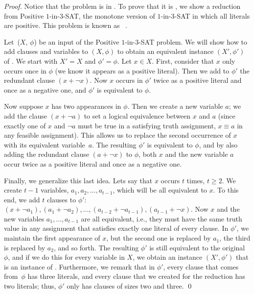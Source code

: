 \begin{proof}
    Notice that the problem is in \classNP{}. To prove that it is \classNPH{}, we show a reduction from Positive $1$-in-$3$-SAT, the monotone version of $1$-in-$3$-SAT in which all literals are positive. This problem is known as \classNPC{}~\cite{Ga79}.

    Let~($X$, $\phi$) be an input of the Positive $1$-in-$3$-SAT problem.
    We will show how to add clauses and variables to $(X, \phi)$ to obtain an equivalent instance $(X', \phi')$ of \rXthreeSAT{}. We start with $X' = X$ and $\phi' = \phi$.
    Let $x \in X$. First, consider that $x$ only occurs once in $\phi$ (we know it appears as a positive literal). Then we add to $\phi'$ the redundant clause $(x + \neg{x})$. Now $x$ occurs in $\phi'$ twice as a positive literal and once as a negative one, and $\phi'$ is equivalent to $\phi$.

    Now suppose $x$ has two appearances in $\phi$. Then we create a new variable $a$; we add the clause $(x + \neg{a})$ to set a logical equivalence between $x$ and $a$ (since exactly one of $x$ and $\neg{a}$ must be true in a satisfying truth assignment, $x \equiv a$ in any feasible assignment).
    This allows us to replace the second occurrence of $x$ with its equivalent variable~$a$. The resulting $\phi'$ is equivalent to $\phi$, and by also adding the redundant clause $(a + \neg{x})$ to $\phi$, both $x$ and the new variable $a$ occur twice as a positive literal and once as a negative one.

    Finally, we generalize this last idea. Lets say that $x$ occurs $t$ times, $t \geq 2$. We create $t-1$ variables, $a_1, a_2, \ldots, a_{t-1}$, which will be all equivalent to $x$. To this end, we add $t$ clauses to $\phi'$: $(x + \neg{a}_1), (a_1 + \neg{a}_2), \ldots, (a_{t-2} + \neg{a}_{t-1}), (a_{t-1} + \neg{x})$. Now $x$ and the new variables $a_1, \ldots, a_{t-1}$ are all equivalent, i.e., they must have the same truth value in any assignment that satisfies exactly one literal of every clause. In $\phi'$, we maintain the first appearance of $x$, but the second one is replaced by $a_1$, the third is replaced by $a_2$, and so forth. The resulting $\phi'$ is still equivalent to the original $\phi$, and if we do this for every variable in $X$, we obtain an instance $(X', \phi')$ that is an instance of \rXthreeSAT{}. Furthermore, we remark that in $\phi'$, every clause that comes from~$\phi$ has three literals, and every clause that we created for the reduction has two literals; thus, $\phi'$ only has clauses of sizes two and three.
    \qed
\end{proof}

